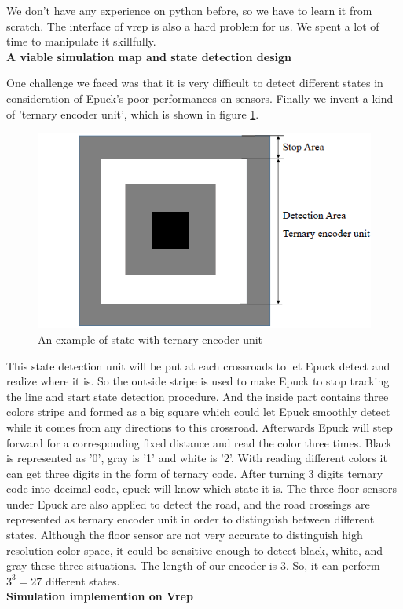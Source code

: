 \documentclass[a4paper, 11pt]{article} %
\begin{document}
We don't have any experience on
python before, so we have to learn it from scratch. The interface of vrep is also
a hard problem for us. We spent a lot of time to manipulate it skillfully.
\\[3ex]
\textbf{A viable simulation map and state detection design}

One challenge we faced was that it is very difficult to detect different states in consideration of Epuck's poor performances on sensors. Finally we invent a kind of 'ternary encoder unit', which is shown in figure \ref{fig2}. 
\begin{figure}[tb]
\centering 
\includegraphics[width=0.6\columnwidth]{encoder} 
\caption[An example of a floating figure]{An example of state with ternary encoder unit} %
\label{fig2} 
\end{figure}
This state detection unit will be put at each crossroads to let Epuck detect and realize where it is. 
So the outside stripe is used to make Epuck to stop tracking the line and start state detection procedure. 
And the inside part contains three colors stripe and formed as a big square which could let Epuck smoothly detect while it comes from any directions to this crossroad. 
Afterwards Epuck will step forward for a corresponding fixed distance and read the color three times. 
Black is represented as '0', gray is '1' and white is '2'. With reading different colors it can get three digits in the form of ternary code. 
After turning 3 digits ternary code into decimal code, epuck will know which state it is.
The three floor sensors under Epuck are also applied to detect the road, and the
road crossings are represented as ternary encoder unit in order to distinguish
between different states. Although the floor sensor are not very accurate to
distinguish high resolution color space, it could be sensitive enough to detect
black, white, and gray these three situations. The length of our encoder is 3.
So, it can perform $3^3 = 27$ different states.
\\[3ex]
\textbf{Simulation implemention on Vrep}
\end{document}
